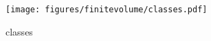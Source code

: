 \begin{figure}[ht]
    \centering
    \texttt{[image: figures/finitevolume/classes.pdf]}
    \caption{classes}
    \label{fig:finitevolume-classes}
\end{figure}

